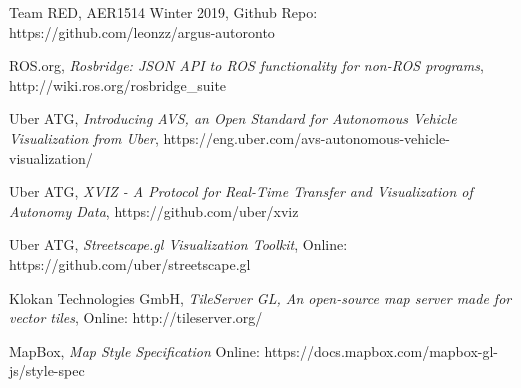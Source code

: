 \documentclass{article}
\begin{document}
\begin{thebibliography}{7}

Team RED, AER1514 Winter 2019, Github Repo: https://github.com/leonzz/argus-autoronto

ROS.org, \textit{Rosbridge: JSON API to ROS functionality for non-ROS programs}, http://wiki.ros.org/rosbridge\_suite

Uber ATG, \textit{Introducing AVS, an Open Standard for Autonomous Vehicle Visualization from Uber}, https://eng.uber.com/avs-autonomous-vehicle-visualization/

Uber ATG, \textit{XVIZ - A Protocol for Real-Time Transfer and Visualization of Autonomy Data}, https://github.com/uber/xviz

Uber ATG, \textit{Streetscape.gl Visualization Toolkit}, Online: https://github.com/uber/streetscape.gl

Klokan Technologies GmbH, \textit{TileServer GL, An open-source map server made for vector tiles}, Online: http://tileserver.org/

MapBox, \textit{Map Style Specification} Online: https://docs.mapbox.com/mapbox-gl-js/style-spec


\end{thebibliography}
\end{document}
